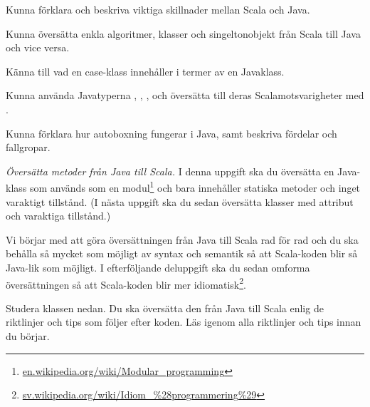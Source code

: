 

\Exercise{\ExeWeekELEVEN}\label{exe:W11}

\begin{Goals}
\item Kunna förklara och beskriva viktiga skillnader mellan Scala och Java.
\item Kunna översätta enkla algoritmer, klasser och singeltonobjekt från Scala till Java och vice versa.
\item Känna till vad en case-klass innehåller i termer av en Javaklass.
\item Kunna använda Javatyperna , , ,  och översätta till deras Scalamotsvarigheter med .
\item Kunna förklara hur autoboxning fungerar i Java, samt beskriva fördelar och fallgropar.
\end{Goals}

\begin{Preparations}
\item {}
\end{Preparations}

\BasicTasks %

\Task \emph{Översätta metoder från Java till Scala.} I denna uppgift ska du översätta en Java-klass som används som en modul\footnote{\href{https://en.wikipedia.org/wiki/Modular_programming}{en.wikipedia.org/wiki/Modular\_programming}} och bara innehåller statiska metoder och inget varaktigt tillstånd. (I nästa uppgift ska du sedan översätta klasser med attribut och varaktiga tillstånd.)

Vi börjar med att göra översättningen från Java till Scala rad för rad och du ska behålla så mycket som möjligt av syntax och semantik så att Scala-koden blir så Java-lik som möjligt. I efterföljande deluppgift ska du sedan omforma översättningen så att Scala-koden blir mer idiomatisk\footnote{\href{https://sv.wikipedia.org/wiki/Idiom_\%28programmering\%29}{sv.wikipedia.org/wiki/Idiom\_\%28programmering\%29}}.

\Subtask Studera klassen  nedan. Du ska översätta den från Java till Scala enlig de riktlinjer och tips som följer efter koden. Läs igenom alla riktlinjer och tips innan du börjar.



